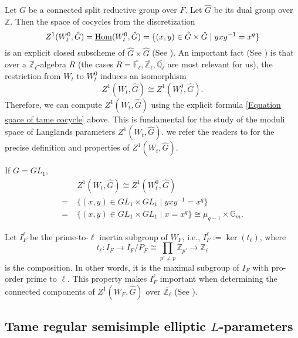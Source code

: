 	Let $G$ be a connected split reductive group over $F$. Let $\hat{G}$ be its dual group over $\mathbb{Z}$. Then the space of cocycles from the discretization
	\begin{equation}\label{Equation space of tame cocycle}
		Z^1(W_t^0, \hat{G})=\underline{\operatorname{\operatorname{Hom}}}(W_t^0, \hat{G})=\{(x, y) \in \hat{G} \times \hat{G}\;|\;yxy^{-1}=x^q\}
	\end{equation}
	is an explicit closed subscheme of $\hat{G} \times \hat{G}$ (See \cite[Section 3]{dat2022ihes}). An important fact (See \cite[Proposition 3.9]{dat2022ihes}) is that over a $\mathbb{Z}_{\ell}$-algebra $R$ (the cases $R=\overline{\mathbb{F}_{\ell}}, \overline{\mathbb{Z}_{\ell}}, \overline{\mathbb{Q}_{\ell}}$ are most relevant for us), the restriction from $W_t$ to $W_t^0$ induces an isomorphism
	$$Z^1(W_t, \hat{G}) \cong Z^1(W_t^0, \hat{G}).$$ 
	Therefore, we can compute $Z^1(W_t, \hat{G})$ using the explicit formula \ref{Equation space of tame cocycle} above. This is fundamental for the study of the moduli space of Langlands parameters $Z^1(W_t, \hat{G})$. we refer the readers to \cite[Section 3 and Section 4]{dat2022ihes} for the precise definition and properties of $Z^1(W_t, \hat{G})$. 
	
	\begin{eg}\label{Example GL_1}
		If $G=GL_1$,
	  \begin{equation*}
	  \begin{aligned}
		&Z^1(W_t, \hat{G}) \cong Z^1(W_t^0, \hat{G})\\
		=\;&\{(x, y) \in GL_1 \times GL_1\;|\;yxy^{-1}=x^q\}\\
		=\;&\{(x, y) \in GL_1 \times GL_1\;|\;x=x^q\} \cong \mu_{q-1} \times \mathbb{G}_m.
	  \end{aligned}
      \end{equation*}
	\end{eg}
	
	Let $I_F^{\ell}$ be the prime-to-$\ell$ inertia subgroup of $W_F$, i.e., $I_F^{\ell}:=\ker(t_{\ell})$, where 
	$$t_\ell: I_F \to I_F/P_F \cong \prod_{p' \neq p}\mathbb{Z}_{p'} \to \mathbb{Z}_\ell$$
	is the composition. In other words, it is the maximal subgroup of $I_F$ with pro-order prime to $\ell$. This property makes $I_F^{\ell}$ important when determining the connected components of $Z^1(W_F, \hat{G})$ over $\overline{\mathbb{Z}_{\ell}}$ (See \cite[Theorem 4.2 and Subsection 4.6]{dat2022ihes}). 
	
	\subsection{Tame regular semisimple elliptic $L$-parameters}\label{Subsection TRSELP}
	
